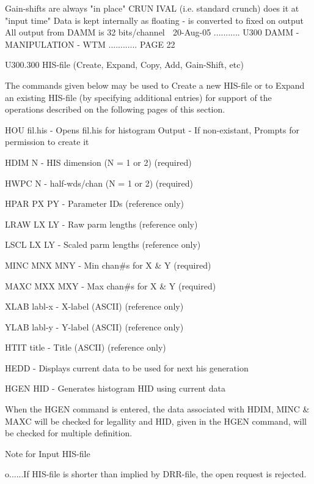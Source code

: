    Gain-shifts are always "in place"
   CRUN IVAL (i.e. standard crunch) does it at "input time"
   Data is kept internally as floating - is converted to fixed on output
   All output from DAMM is 32 bits/channel
    
   20-Aug-05 ........... U300  DAMM - MANIPULATION - WTM ............ PAGE  22
 
 
   U300.300  HIS-file (Create, Expand, Copy, Add, Gain-Shift, etc)
 
   The commands given below may be used to Create a new HIS-file or to  Expand
   an  existing HIS-file (by specifying additional entries) for support of the
   operations described on the following pages of this section.
 
   HOU  fil.his     - Opens fil.his for histogram Output
                    - If non-existant, Prompts for permission to create it
 
   HDIM N           - HIS dimension (N = 1 or 2) (required)
 
   HWPC N           - half-wds/chan (N = 1 or 2) (required)
 
   HPAR PX PY       - Parameter IDs              (reference only)
 
   LRAW LX LY       - Raw    parm lengths        (reference only)
 
   LSCL LX LY       - Scaled parm lengths        (reference only)
 
   MINC MNX MNY     - Min chan#s for X & Y       (required)
 
   MAXC MXX MXY     - Max chan#s for X & Y       (required)
 
   XLAB labl-x      - X-label (ASCII)            (reference only)
 
   YLAB labl-y      - Y-label (ASCII)            (reference only)
 
   HTIT title       - Title   (ASCII)            (reference only)
 
   HEDD             - Displays current data to be used for next his generation
 
   HGEN HID         - Generates histogram HID using current data
 
 
   When the HGEN command is entered, the data associated  with  HDIM,  MINC  &
   MAXC  will  be  checked  for  legallity and HID, given in the HGEN command,
   will be checked for multiple definition.
 
   Note for Input HIS-file
 
   o......If HIS-file is shorter than implied by DRR-file,  the  open  request
          is rejected.
 
